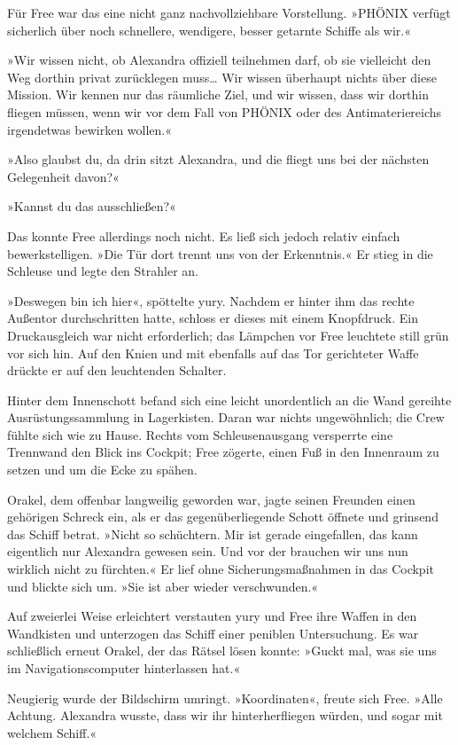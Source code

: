 Für Free war das eine nicht ganz nachvollziehbare Vorstellung. »PHÖNIX verfügt sicherlich über noch schnellere, wendigere, besser getarnte Schiffe als wir.«

»Wir wissen nicht, ob Alexandra offiziell teilnehmen darf, ob sie vielleicht den Weg dorthin privat zurücklegen muss… Wir wissen überhaupt nichts über diese Mission. Wir kennen nur das räumliche Ziel, und wir wissen, dass wir dorthin fliegen müssen, wenn wir vor dem Fall von PHÖNIX oder des Antimateriereichs irgendetwas bewirken wollen.«

»Also glaubst du, da drin sitzt Alexandra, und die fliegt uns bei der nächsten Gelegenheit davon?«

»Kannst du das ausschließen?«

Das konnte Free allerdings noch nicht. Es ließ sich jedoch relativ einfach bewerkstelligen. »Die Tür dort trennt uns von der Erkenntnis.« Er stieg in die Schleuse und legte den Strahler an.

»Deswegen bin ich hier«, spöttelte yury. Nachdem er hinter ihm das rechte Außentor durchschritten hatte, schloss er dieses mit einem Knopfdruck. Ein Druckausgleich war nicht erforderlich; das Lämpchen vor Free leuchtete still grün vor sich hin. Auf den Knien und mit ebenfalls auf das Tor gerichteter Waffe drückte er auf den leuchtenden Schalter.

Hinter dem Innenschott befand sich eine leicht unordentlich an die Wand gereihte Ausrüstungssammlung in Lagerkisten. Daran war nichts ungewöhnlich; die Crew fühlte sich wie zu Hause. Rechts vom Schleusenausgang versperrte eine Trennwand den Blick ins Cockpit; Free zögerte, einen Fuß in den Innenraum zu setzen und um die Ecke zu spähen.

Orakel, dem offenbar langweilig geworden war, jagte seinen Freunden einen gehörigen Schreck ein, als er das gegenüberliegende Schott öffnete und grinsend das Schiff betrat. »Nicht so schüchtern. Mir ist gerade eingefallen, das kann eigentlich nur Alexandra gewesen sein. Und vor der brauchen wir uns nun wirklich nicht zu fürchten.« Er lief ohne Sicherungsmaßnahmen in das Cockpit und blickte sich um. »Sie ist aber wieder verschwunden.«

Auf zweierlei Weise erleichtert verstauten yury und Free ihre Waffen in den Wandkisten und unterzogen das Schiff einer peniblen Untersuchung. Es war schließlich erneut Orakel, der das Rätsel lösen konnte: »Guckt mal, was sie uns im Navigationscomputer hinterlassen hat.«

Neugierig wurde der Bildschirm umringt. »Koordinaten«, freute sich Free. »Alle Achtung. Alexandra wusste, dass wir ihr hinterherfliegen würden, und sogar mit welchem Schiff.«

